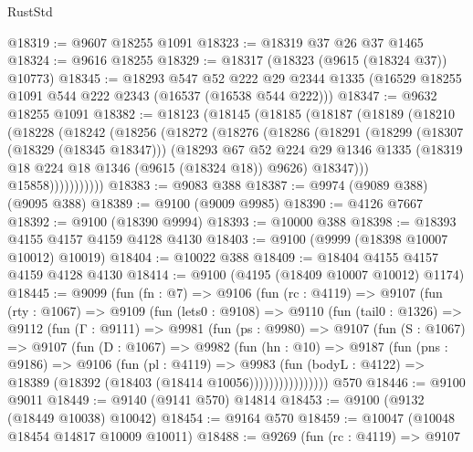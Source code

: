 \begin{lexlean}{RustStd}
\begin{coremodule}
@18319 := @9607 @18255 @1091
@18323 := @18319 @37 @26 @37 @1465
@18324 := @9616 @18255
@18329 := @18317 (@18323 (@9615 (@18324 @37)) @10773)
@18345 := @18293
    @547
    @52
    @222
    @29
    @2344
    @1335
    (@16529 @18255 @1091 @544 @222 @2343 (@16537 (@16538 @544 @222)))
@18347 := @9632 @18255 @1091
@18382 := @18123
    (@18145
      (@18185
        (@18187
          (@18189
            (@18210
              (@18228
                (@18242
                  (@18256
                    (@18272
                      (@18276
                        (@18286
                          (@18291
                            (@18299
                              (@18307 (@18329 (@18345 @18347)))
                              (@18293
                                @67
                                @52
                                @224
                                @29
                                @1346
                                @1335
                                (@18319 @18 @224 @18 @1346 (@9615 (@18324 @18)) @9626)
                                @18347)))
                          @15858)))))))))))
@18383 := @9083 @388
@18387 := @9974 (@9089 @388) (@9095 @388)
@18389 := @9100 (@9009 @9985)
@18390 := @4126 @7667
@18392 := @9100 (@18390 @9994)
@18393 := @10000 @388
@18398 := @18393 @4155 @4157 @4159 @4128 @4130
@18403 := @9100 (@9999 (@18398 @10007 @10012) @10019)
@18404 := @10022 @388
@18409 := @18404 @4155 @4157 @4159 @4128 @4130
@18414 := @9100 (@4195 (@18409 @10007 @10012) @1174)
@18445 := @9099
    (fun (fn : @7) =>
    @9106
      (fun (rc : @4119) =>
      @9107
        (fun (rty : @1067) =>
        @9109
          (fun (lets0 : @9108) =>
          @9110
            (fun (tail0 : @1326) =>
            @9112
              (fun (Γ : @9111) =>
              @9981
                (fun (ps : @9980) =>
                @9107
                  (fun (S : @1067) =>
                  @9107
                    (fun (D : @1067) =>
                    @9982
                      (fun (hn : @10) =>
                      @9187
                        (fun (pns : @9186) =>
                        @9106
                          (fun (pl : @4119) =>
                          @9983
                            (fun (bodyL : @4122) =>
                            @18389 (@18392 (@18403 (@18414 @10056))))))))))))))))
    @570
@18446 := @9100 @9011
@18449 := @9140 (@9141 @570) @14814
@18453 := @9100 (@9132 (@18449 @10038) @10042)
@18454 := @9164 @570
@18459 := @10047 (@10048 @18454 @14817 @10009 @10011)
@18488 := @9269
    (fun (rc : @4119) =>
    @9107

\end{coremodule}
\end{lexlean}

